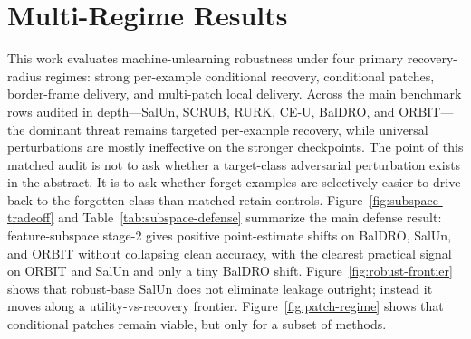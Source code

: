 \section{Multi-Regime Results}
\label{sec:results}

This work evaluates machine-unlearning robustness under four primary recovery-radius regimes: strong per-example conditional recovery, conditional patches, border-frame delivery, and multi-patch local delivery. Across the main benchmark rows audited in depth---SalUn, SCRUB, RURK, CE-U, BalDRO, and ORBIT---the dominant threat remains targeted per-example recovery, while universal perturbations are mostly ineffective on the stronger checkpoints. The point of this matched audit is not to ask whether a target-class adversarial perturbation exists in the abstract. It is to ask whether forget examples are selectively easier to drive back to the forgotten class than matched retain controls. Figure~\ref{fig:subspace-tradeoff} and Table~\ref{tab:subspace-defense} summarize the main defense result: feature-subspace stage-2 gives positive point-estimate shifts on BalDRO, SalUn, and ORBIT without collapsing clean accuracy, with the clearest practical signal on ORBIT and SalUn and only a tiny BalDRO shift. Figure~\ref{fig:robust-frontier} shows that robust-base SalUn does not eliminate leakage outright; instead it moves along a utility-vs-recovery frontier. Figure~\ref{fig:patch-regime} shows that conditional patches remain viable, but only for a subset of methods.

